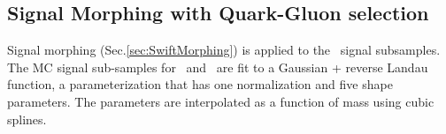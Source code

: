 \subsection{Signal Morphing with Quark-Gluon selection}

Signal morphing (Sec.\ref{sec:SwiftMorphing}) is applied to the \qstar\ signal subsamples. The MC signal 
sub-samples for \QQ\ and \QG\ are fit to a Gaussian + reverse Landau function, a parameterization that has 
one normalization  and five shape parameters. The parameters are interpolated as a function of mass using cubic splines.

